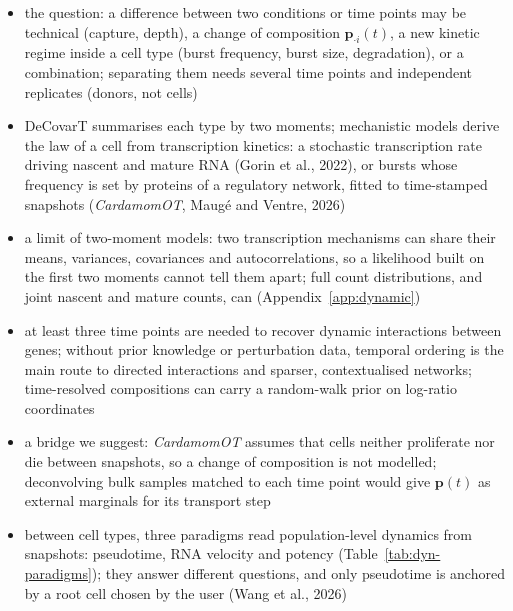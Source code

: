 \documentclass[pdflatex, sn-nature]{sn-jnl}
\theoremstyle{thmstyleone}%
\theoremstyle{thmstyletwo}%
\theoremstyle{thmstylethree}%
\begin{document}
\begin{itemize}
  \item the question: a difference between two conditions or time points may be technical (capture, depth), a change
        of composition \(\boldsymbol{p}_{\cdot i}(t)\), a new kinetic regime inside a cell type (burst frequency, burst size,
        degradation), or a combination; separating them needs several time points and independent replicates (donors,
        not cells)
  \item DeCovarT summarises each type by two moments; mechanistic models derive the law of a cell from transcription
        kinetics: a stochastic transcription rate driving nascent and mature RNA (Gorin et al., 2022), or bursts whose
        frequency is set by proteins of a regulatory network, fitted to time-stamped snapshots (\emph{CardamomOT}, Maugé and
        Ventre, 2026)
  \item a limit of two-moment models: two transcription mechanisms can share their means, variances, covariances and
        autocorrelations, so a likelihood built on the first two moments cannot tell them apart; full count distributions,
        and joint nascent and mature counts, can (Appendix~\ref{app:dynamic})
  \item at least three time points are needed to recover dynamic interactions between genes; without prior knowledge
        or perturbation data, temporal ordering is the main route to directed interactions and sparser, contextualised
        networks; time-resolved compositions can carry a random-walk prior on log-ratio coordinates
        \cite{kimLongitudinalProfilingLowAbundance2025}
  \item a bridge we suggest: \emph{CardamomOT} assumes that cells neither proliferate nor die between snapshots, so a change of
        composition is not modelled; deconvolving bulk samples matched to each time point would give
        \(\boldsymbol{p}(t)\) as external marginals for its transport step
  \item between cell types, three paradigms read population-level dynamics from snapshots: pseudotime, RNA velocity and
        potency (Table~\ref{tab:dyn-paradigms}); they answer different questions, and only pseudotime is anchored by a
        root cell chosen by the user (Wang et al., 2026)

\end{itemize}
\end{document}
